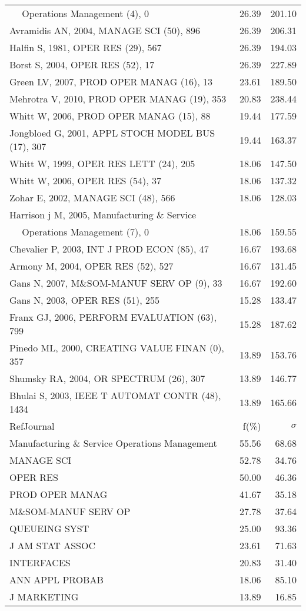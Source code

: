 \documentclass[a4paper,11pt]{report}
\begin{document}
\begin{landscape}
\begin{table}[!ht]
{\begin{tabular}{|l r r|}
$\quad$ Operations Management (4), 0 & 26.39 & 201.10\\
Avramidis AN, 2004, MANAGE SCI (50), 896 & 26.39 & 206.31\\
Halfin S, 1981, OPER RES (29), 567 & 26.39 & 194.03\\
Borst S, 2004, OPER RES (52), 17 & 26.39 & 227.89\\
Green LV, 2007, PROD OPER MANAG (16), 13 & 23.61 & 189.50\\
Mehrotra V, 2010, PROD OPER MANAG (19), 353 & 20.83 & 238.44\\
Whitt W, 2006, PROD OPER MANAG (15), 88 & 19.44 & 177.59\\
Jongbloed G, 2001, APPL STOCH MODEL BUS (17), 307 & 19.44 & 163.37\\
Whitt W, 1999, OPER RES LETT (24), 205 & 18.06 & 147.50\\
Whitt W, 2006, OPER RES (54), 37 & 18.06 & 137.32\\
Zohar E, 2002, MANAGE SCI (48), 566 & 18.06 & 128.03\\
Harrison j M, 2005, Manufacturing \& Service &  & \\
$\quad$ Operations Management (7), 0 & 18.06 & 159.55\\
Chevalier P, 2003, INT J PROD ECON (85), 47 & 16.67 & 193.68\\
Armony M, 2004, OPER RES (52), 527 & 16.67 & 131.45\\
Gans N, 2007, M\&SOM-MANUF SERV OP (9), 33 & 16.67 & 192.60\\
Gans N, 2003, OPER RES (51), 255 & 15.28 & 133.47\\
Franx GJ, 2006, PERFORM EVALUATION (63), 799 & 15.28 & 187.62\\
Pinedo ML, 2000, CREATING VALUE FINAN (0), 357 & 13.89 & 153.76\\
Shumsky RA, 2004, OR SPECTRUM (26), 307 & 13.89 & 146.77\\
Bhulai S, 2003, IEEE T AUTOMAT CONTR (48), 1434 & 13.89 & 165.66\\
\hline
\hline
RefJournal & f(\%) & $\sigma$\\
\hline
Manufacturing \& Service Operations Management & 55.56 & 68.68\\
MANAGE SCI & 52.78 & 34.76\\
OPER RES & 50.00 & 46.36\\
PROD OPER MANAG & 41.67 & 35.18\\
M\&SOM-MANUF SERV OP & 27.78 & 37.64\\
QUEUEING SYST & 25.00 & 93.36\\
J AM STAT ASSOC & 23.61 & 71.63\\
INTERFACES & 20.83 & 31.40\\
ANN APPL PROBAB & 18.06 & 85.10\\
J MARKETING & 13.89 & 16.85\\
\hline
\end{tabular}
}
\end{table}


\end{landscape}
\end{document}
